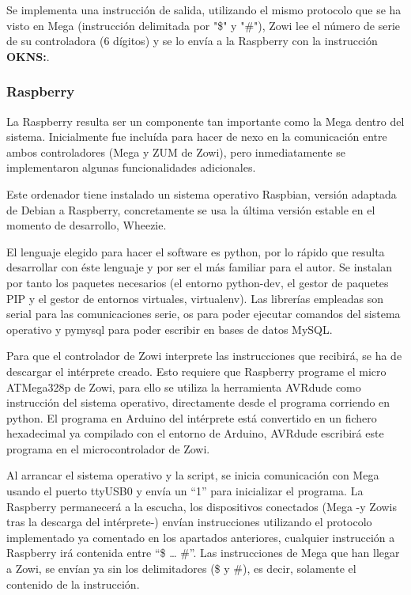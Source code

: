 Se implementa una instrucción de salida, utilizando el mismo protocolo que se ha visto en Mega (instrucción delimitada por "\$" y "\#"), Zowi lee el número de serie de su controladora (6 dígitos) y se lo envía a la Raspberry con la instrucción \textbf{OKNS:}.

\subsubsection{Raspberry}

La Raspberry resulta ser un componente tan importante como la Mega dentro del sistema. Inicialmente fue incluída para hacer de nexo en la comunicación entre ambos controladores (Mega y ZUM de Zowi), pero inmediatamente se implementaron algunas funcionalidades adicionales.

Este ordenador tiene instalado un sistema operativo Raspbian, versión adaptada de Debian a Raspberry, concretamente se usa la última versión estable en el momento de desarrollo, Wheezie.

El lenguaje elegido para hacer el software es python, por lo rápido que resulta desarrollar con éste lenguaje y por ser el más familiar para el autor. Se instalan por tanto los paquetes necesarios (el entorno python-dev, el gestor de paquetes PIP y el gestor de entornos virtuales, virtualenv). Las librerías empleadas son serial para las comunicaciones serie, os para poder ejecutar comandos del sistema operativo y pymysql para poder escribir en bases de datos MySQL.

Para que el controlador de Zowi interprete las instrucciones que recibirá, se ha de descargar el intérprete creado. Esto requiere que Raspberry programe el micro ATMega328p de Zowi, para ello se utiliza la herramienta AVRdude como instrucción del sistema operativo, directamente desde el programa corriendo en python.
El programa en Arduino del intérprete está convertido en un fichero hexadecimal ya compilado con el entorno de Arduino, AVRdude escribirá este programa en el microcontrolador de Zowi.

Al arrancar el sistema operativo y la script, se inicia comunicación con Mega usando el puerto ttyUSB0 y envía un “1” para inicializar el programa. La Raspberry permanecerá a la escucha, los dispositivos conectados (Mega -y Zowis tras la descarga del intérprete-) envían instrucciones utilizando el protocolo implementado ya comentado en los apartados anteriores, cualquier instrucción a Raspberry irá contenida entre “\$ … \#”. Las instrucciones de Mega que han llegar a Zowi, se envían ya sin los delimitadores (\$ y \#), es decir, solamente el contenido de la instrucción.

